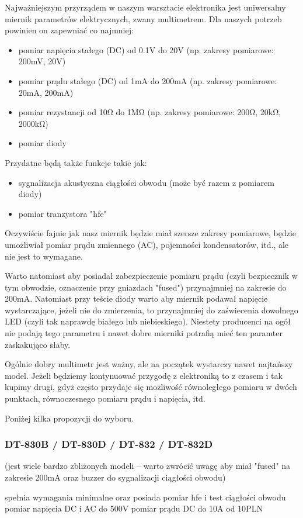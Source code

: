 Najważniejszym przyrządem w naszym warsztacie elektronika jest uniwersalny miernik parametrów elektrycznych, zwany multimetrem.
Dla naszych potrzeb powinien on zapewniać co najmniej:
\begin{itemize}
	\item pomiar napięcia stałego (DC) od 0.1V do 20V (np. zakresy pomiarowe: 200mV, 20V)
	\item pomiar prądu stałego (DC) od 1mA do 200mA (np. zakresy pomiarowe: 20mA, 200mA)
	\item pomiar rezystancji od 10Ω do 1MΩ (np. zakresy pomiarowe: 200Ω, 20kΩ, 2000kΩ)
	\item pomiar diody
\end{itemize}

\noindent
Przydatne będą także funkcje takie jak:
\begin{itemize}
	\item  sygnalizacja akustyczna ciągłości obwodu (może być razem z pomiarem diody)
	\item pomiar tranzystora "hfe"
\end{itemize}
Oczywiście fajnie jak nasz miernik będzie miał szersze zakresy pomiarowe, będzie umożliwiał pomiar prądu zmiennego (AC), pojemności kondensatorów, itd., ale nie jest to wymagane.

Warto natomiast aby posiadał zabezpieczenie pomiaru prądu (czyli bezpiecznik w tym obwodzie, oznaczenie przy gniazdach "fused") przynajmniej na zakresie do 200mA.
Natomiast przy teście diody warto aby miernik podawał napięcie wystarczające, jeżeli nie do zmierzenia, to przynajmniej do zaświecenia dowolnego LED (czyli tak naprawdę białego lub niebieskiego).
	Niestety producenci na ogół nie podają tego parametru i nawet dobre mierniki potrafią mieć ten paramter zaskakująco słaby.

Ogólnie dobry multimetr jest ważny, ale na początek wystarczy nawet najtańszy model. Jeżeli będziemy kontynuować przygodę z elektroniką to z czasem i tak kupimy drugi, gdyż często przydaje się możliwość równoległego pomiaru w dwóch punktach, równoczesnego pomiaru prądu i napięcia, itd.

Poniżej kilka propozycji do wyboru.

\subsubsection{DT-830B /  DT-830D / DT-832 / DT-832D} (jest wiele bardzo zbliżonych modeli – warto zwrócić uwagę aby miał "fused" na zakresie 200mA oraz buzzer do sygnalizacji ciągłości obwodu)
	\begin{itemize}
		\zaleta spełnia wymagania minimalne oraz posiada pomiar hfe i test ciągłości obwodu
		\zaleta pomiar napięcia DC i AC do 500V
		\zaleta pomiar prądu DC do 10A
		\info od 10PLN
	\end{itemize}

